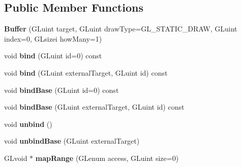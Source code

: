 \subsection*{Public Member Functions}
\begin{DoxyCompactItemize}
\item 
\hypertarget{classfillwave_1_1core_1_1Buffer_a0eb4bd71707615e42f8b9c5c6b35b4fa}{}{\bfseries Buffer} (G\+Luint target, G\+Luint draw\+Type=G\+L\+\_\+\+S\+T\+A\+T\+I\+C\+\_\+\+D\+R\+A\+W, G\+Luint index=0, G\+Lsizei how\+Many=1)\label{classfillwave_1_1core_1_1Buffer_a0eb4bd71707615e42f8b9c5c6b35b4fa}

\item 
\hypertarget{classfillwave_1_1core_1_1Buffer_a21dfbdb4ff7f15cd6e16ce25c9dc795b}{}void {\bfseries bind} (G\+Luint id=0) const \label{classfillwave_1_1core_1_1Buffer_a21dfbdb4ff7f15cd6e16ce25c9dc795b}

\item 
\hypertarget{classfillwave_1_1core_1_1Buffer_a02eb01c40bcac9358bff281d9d8ef1a0}{}void {\bfseries bind} (G\+Luint external\+Target, G\+Luint id) const \label{classfillwave_1_1core_1_1Buffer_a02eb01c40bcac9358bff281d9d8ef1a0}

\item 
\hypertarget{classfillwave_1_1core_1_1Buffer_a9ae874855b47ce63ee01d033e2c138ed}{}void {\bfseries bind\+Base} (G\+Luint id=0) const \label{classfillwave_1_1core_1_1Buffer_a9ae874855b47ce63ee01d033e2c138ed}

\item 
\hypertarget{classfillwave_1_1core_1_1Buffer_adc36a13505fc5427c69e6d5019fc1eb1}{}void {\bfseries bind\+Base} (G\+Luint external\+Target, G\+Luint id) const \label{classfillwave_1_1core_1_1Buffer_adc36a13505fc5427c69e6d5019fc1eb1}

\item 
\hypertarget{classfillwave_1_1core_1_1Buffer_ac6a6349e4040634ac8f30b63d47267fd}{}void {\bfseries unbind} ()\label{classfillwave_1_1core_1_1Buffer_ac6a6349e4040634ac8f30b63d47267fd}

\item 
\hypertarget{classfillwave_1_1core_1_1Buffer_ab2cc00ce071c66ab404940ed6794e22b}{}void {\bfseries unbind\+Base} (G\+Luint external\+Target)\label{classfillwave_1_1core_1_1Buffer_ab2cc00ce071c66ab404940ed6794e22b}

\item 
\hypertarget{classfillwave_1_1core_1_1Buffer_a8c4dd179a3d765a44368707241d9a5ec}{}G\+Lvoid $\ast$ {\bfseries map\+Range} (G\+Lenum access, G\+Luint size=0)\label{classfillwave_1_1core_1_1Buffer_a8c4dd179a3d765a44368707241d9a5ec}


\end{DoxyCompactItemize}
